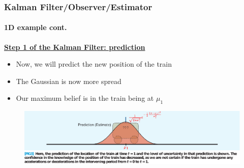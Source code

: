 \begin{frame}[plain]\pw\Large
\frametitle{Kalman Filter/Observer/Estimator}
\framesubtitle{1D example \tiny cont.}

\scriptsize

\underline{\textbf{Step 1 of the Kalman Filter: prediction}}
\begin{itemize}\scriptsize
\item Now, we will predict the new position of the train
\item The Gaussian is now more spread
\item Our maximum belief is in the train being at {\color{red}$\mu_1$}
\end{itemize}
\begin{figure}[h]
\centering
\includegraphics[width=1.35\textwidth]{figs/2012_MAG_Understanding_the_Basis_of_the_Kalman_Filter_fig3.pdf}
\end{figure}

\end{frame}


